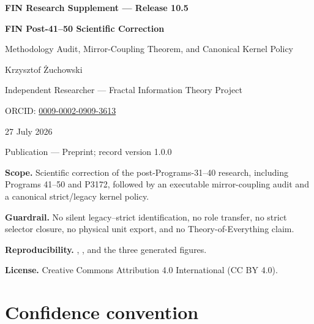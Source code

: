\documentclass[11pt,a4paper,openany]{report}
\begin{document}
\hypersetup{pageanchor=false}
\begin{titlepage}
\centering
\vspace*{10mm}
{\Large\bfseries FIN Research Supplement --- Release 10.5\par}
\vspace{11mm}
{\Huge\bfseries FIN Post-41--50 Scientific Correction\par}
\vspace{6mm}
{\Large Methodology Audit, Mirror-Coupling Theorem, and Canonical Kernel Policy\par}
\vspace{17mm}
{\Large Krzysztof \.Zuchowski\par}
\vspace{2mm}
{\normalsize Independent Researcher --- Fractal Information Theory Project\par}
\vspace{2mm}
{\normalsize ORCID: \href{https://orcid.org/0009-0002-0909-3613}{0009-0002-0909-3613}\par}
\vspace{10mm}
{\large 27 July 2026\par}
{\normalsize Publication --- Preprint; record version 1.0.0\par}
\vfill
\begin{minipage}{0.88\textwidth}
\small
\textbf{Scope.} Scientific correction of the post-Programs-31--40 research,
including Programs 41--50 and P3172, followed by an executable mirror-coupling
audit and a canonical strict/legacy kernel policy.

\medskip
\textbf{Guardrail.} No silent legacy--strict identification, no role transfer,
no strict selector closure, no physical unit export, and no
Theory-of-Everything claim.

\medskip
\textbf{Reproducibility.}
,
, and the three generated figures.

\medskip
\textbf{License.} Creative Commons Attribution 4.0 International (CC BY 4.0).
\end{minipage}
\vfill
\end{titlepage}
\hypersetup{pageanchor=true}

\tableofcontents
\clearpage
{}

\section{Confidence convention}
\end{document}

